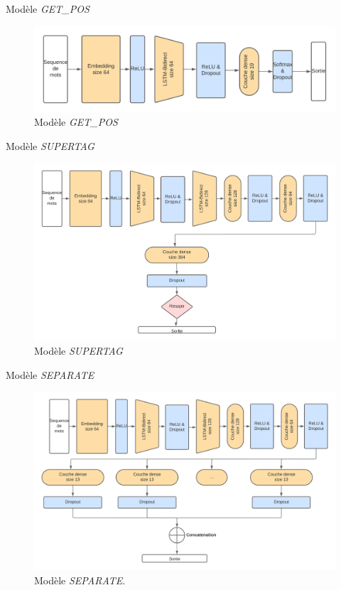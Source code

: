 \documentclass[11pt]{beamer}
\begin{document}
\begin{frame}{Modèle \textit{GET\_POS}}
    \begin{figure}
        \centering
        \includegraphics[width=\textwidth]{get_pos.png}
        \caption{Modèle \textit{GET\_POS}}
        \label{fig: model getpos}
    \end{figure} 
\end{frame}

\begin{frame}{Modèle \textit{SUPERTAG}}
    \begin{figure}
        \centering
        \includegraphics[width=\textwidth]{get_morphy_supertag.png}
        \caption{Modèle \textit{SUPERTAG}}
        \label{fig: model supertag}
    \end{figure}
\end{frame}

\begin{frame}{Modèle \textit{SEPARATE}}
    \begin{figure}
        \centering
        \includegraphics[width=\textwidth]{get_morphy_separate.png}
        \caption{Modèle \textit{SEPARATE}.}
        \label{fig: model separate}
    \end{figure}
\end{frame}
\end{document}
